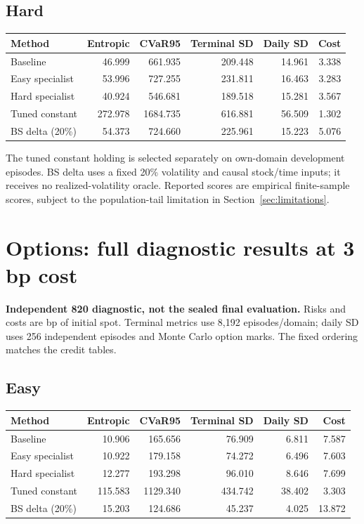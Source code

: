 \documentclass[11pt,a4paper]{article}
\begin{document}
\subsection*{Hard}
\begin{small}
\begin{tabular}{lrrrrr}
\toprule
Method & Entropic & CVaR95 & Terminal SD & Daily SD & Cost \\
\midrule
Baseline & 46.999 & 661.935 & 209.448 & 14.961 & 3.338 \\
Easy specialist & 53.996 & 727.255 & 231.811 & 16.463 & 3.283 \\
Hard specialist & 40.924 & 546.681 & 189.518 & 15.281 & 3.567 \\
Tuned constant & 272.978 & 1684.735 & 616.881 & 56.509 & 1.302 \\
BS delta (20\%) & 54.373 & 724.660 & 225.961 & 15.223 & 5.076 \\
\bottomrule
\end{tabular}
\end{small}\par\medskip
The tuned constant holding is selected separately on own-domain development episodes. BS delta uses a fixed 20\% volatility and causal stock/time inputs; it receives no realized-volatility oracle. Reported scores are empirical finite-sample scores, subject to the population-tail limitation in Section~\ref{sec:limitations}.
\clearpage
\section{Options: full diagnostic results at 3 bp cost}
\textbf{Independent 820 diagnostic, not the sealed final evaluation.} Risks and costs are bp of initial spot. Terminal metrics use 8,192 episodes/domain; daily SD uses 256 independent episodes and Monte Carlo option marks. The fixed ordering matches the credit tables.

\subsection*{Easy}
\begin{small}
\begin{tabular}{lrrrrr}
\toprule
Method & Entropic & CVaR95 & Terminal SD & Daily SD & Cost \\
\midrule
Baseline & 10.906 & 165.656 & 76.909 & 6.811 & 7.587 \\
Easy specialist & 10.922 & 179.158 & 74.272 & 6.496 & 7.603 \\
Hard specialist & 12.277 & 193.298 & 96.010 & 8.646 & 7.699 \\
Tuned constant & 115.583 & 1129.340 & 434.742 & 38.402 & 3.303 \\
BS delta (20\%) & 15.203 & 124.686 & 45.237 & 4.025 & 13.872 \\
\bottomrule
\end{tabular}
\end{small}\par\medskip
\end{document}
